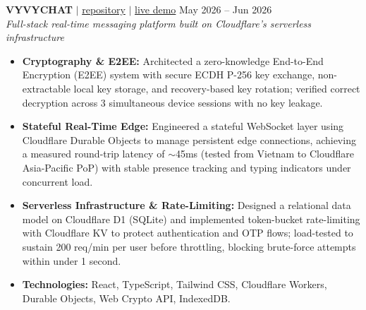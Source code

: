 \documentclass[10pt,a4paper]{article}
\begin{document}
\noindent \textbf{VYVYCHAT} $|$ \href{https://github.com/vyquochuy/vyvychat}{repository} $|$ \href{https://vyvychat.myvault-service.workers.dev/}{live demo} \hfill May 2026 -- Jun 2026\\ \textit{Full-stack real-time messaging platform built on Cloudflare's serverless infrastructure}\\
\begin{itemize}[leftmargin=0.25in, nosep]
    \item \textbf{Cryptography \& E2EE:} Architected a zero-knowledge End-to-End Encryption (E2EE) system with secure ECDH P-256 key exchange, non-extractable local key storage, and recovery-based key rotation; verified correct decryption across 3 simultaneous device sessions with no key leakage.

    \item \textbf{Stateful Real-Time Edge:} Engineered a stateful WebSocket layer using Cloudflare Durable Objects to manage persistent edge connections, achieving a measured round-trip latency of $\sim$45ms (tested from Vietnam to Cloudflare Asia-Pacific PoP) with stable presence tracking and typing indicators under concurrent load.

    \item \textbf{Serverless Infrastructure \& Rate-Limiting:} Designed a relational data model on Cloudflare D1 (SQLite) and implemented token-bucket rate-limiting with Cloudflare KV to protect authentication and OTP flows; load-tested to sustain 200 req/min per user before throttling, blocking brute-force attempts within under 1 second.

    \item \textbf{Technologies:} React, TypeScript, Tailwind CSS, Cloudflare Workers, Durable Objects, Web Crypto API, IndexedDB.
\end{itemize}
\vspace{10pt}
\end{document}
